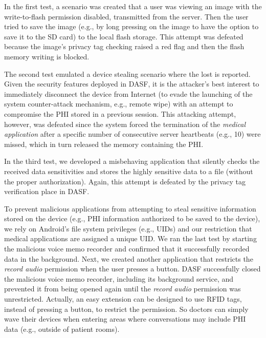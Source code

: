 In the first test, a scenario was created that a user was viewing an
image with the write-to-flash permission disabled, transmitted from
the server.  Then the user tried to save the image (e.g., by long
pressing on the image to have the option to save it to the SD card) to
the local flash storage.  This attempt was defeated 
because the image's privacy tag checking raised a red flag and then
the flash memory writing is blocked. 


The second test emulated a device stealing scenario where the lost is
reported. Given the security features deployed in DASF, it is the
attacker's best interest to immediately disconnect the device from
Internet (to evade the launching of the system counter-attack
mechanism, e.g., remote wipe) with an attempt to compromise the PHI
stored in a previous session. This attacking attempt, however, was
defeated since the system forced the termination of
the \textit{medical application} after a specific number of
consecutive server heartbeats (e.g., 10) were missed, which in turn
released the memory containing the PHI.


In the third test, we developed a misbehaving application that
silently checks the received data sensitivities and stores the highly
sensitive data to a file (without the proper authorization). Again,
this attempt is defeated by the privacy tag verification place in
DASF. 


To prevent malicious applications from attempting to steal sensitive
information stored on the device (e.g., PHI information authorized to
be saved to the device), we rely on Android's file system privileges
(e.g., UIDs) and our restriction that medical applications are
assigned a unique UID. We ran the last test by starting the malicious
voice memo recorder and confirmed that it successfully recorded data
in the background.  Next, we created another application that
restricts the \textit{record audio} permission when the user presses a
button. DASF successfully closed the malicious voice memo recorder,
including its background service, and prevented it from being opened
again until the \textit{record audio} permission was
unrestricted. Actually, an easy extension can be designed to use RFID
tags, instead of pressing a button, to restrict the permission. So
doctors can simply wave their devices when entering areas where
conversations may include PHI data (e.g., outside of patient rooms).  

